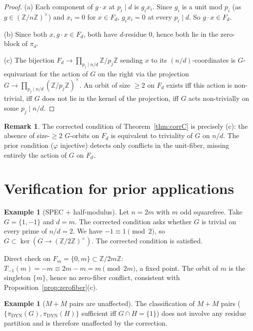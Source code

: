 \documentclass[11pt,reqno]{amsart}
\theoremstyle{plain}
\theoremstyle{definition}
\newtheorem{remark}[theorem]{Remark}
\newtheorem{example}[theorem]{Example}
\newcommand{\Z}{\mathbb{Z}}
\newcommand{\Zns}{(\Z/n\Z)^{\times}}
\newcommand{\DYN}{\mathrm{DYN}}
\begin{document}
\begin{proof}
(a) Each component of $g \cdot x$ at $p_i \mid d$ is $g_i x_i$. Since $g_i$ is a unit mod $p_i$ (as $g \in \Zns$) and $x_i = 0$ for $x \in F_d$, $g_i x_i = 0$ at every $p_i \mid d$. So $g \cdot x \in F_d$.

(b) Since both $x, g \cdot x \in F_d$, both have $d$-residue $0$, hence both lie in the zero-block of $\pi_d$.

(c) The bijection $F_d \to \prod_{p_j \mid n/d} \Z/p_j\Z$ sending $x$ to its $(n/d)$-coordinates is $G$-equivariant for the action of $G$ on the right via the projection $G \to \prod_{p_j \mid n/d} (\Z/p_j\Z)^{\times}$. An orbit of size $\geq 2$ on $F_d$ exists iff this action is non-trivial, iff $G$ does not lie in the kernel of the projection, iff $G$ acts non-trivially on some $p_j \mid n/d$.
\end{proof}

\begin{remark}
The corrected condition of Theorem~\ref{thm:corrC} is precisely (c): the absence of size-$\geq 2$ $G$-orbits on $F_d$ is equivalent to triviality of $G$ on $n/d$. The prior condition ($\varphi$ injective) detects only conflicts in the unit-fiber, missing entirely the action of $G$ on $F_d$.
\end{remark}

\section{Verification for prior applications}

\begin{example}[SPEC + half-modulus]
Let $n = 2m$ with $m$ odd squarefree. Take $G = \{1,-1\}$ and $d = m$. The corrected condition asks whether $G$ is trivial on every prime of $n/d = 2$. We have $-1 \equiv 1 \pmod 2$, so $G \subset \ker(G \to (\Z/2\Z)^{\times})$. The corrected condition is satisfied.

Direct check on $F_m = \{0, m\} \subset \Z/2m\Z$: $T_{-1}(m) = -m \equiv 2m - m = m \pmod{2m}$, a fixed point. The orbit of $m$ is the singleton $\{m\}$, hence no zero-fiber conflict, consistent with Proposition~\ref{prop:zerofiber}(c).
\end{example}

\begin{example}[$M{+}M$ pairs are unaffected]
The classification of $M{+}M$ pairs ($\{\pi_{\DYN}(G), \pi_{\DYN}(H)\}$ sufficient iff $G \cap H = \{1\}$) does not involve any residue partition and is therefore unaffected by the correction.
\end{example}
\end{document}
